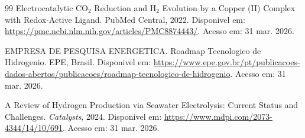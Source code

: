 \documentclass[12pt,oneside,a4paper,english,brazilian]{abntex2}
\begin{document}
\begin{thebibliography}{99}
Electrocatalytic CO$_2$ Reduction and H$_2$ Evolution by a Copper (II) Complex with Redox-Active Ligand. PubMed Central, 2022. Disponivel em: \url{https://pmc.ncbi.nlm.nih.gov/articles/PMC8874443/}. Acesso em: 31 mar. 2026.

EMPRESA DE PESQUISA ENERGETICA. Roadmap Tecnologico de Hidrogenio. EPE, Brasil. Disponivel em: \url{https://www.epe.gov.br/pt/publicacoes-dados-abertos/publicacoes/roadmap-tecnologico-de-hidrogenio}. Acesso em: 31 mar. 2026.

A Review of Hydrogen Production via Seawater Electrolysis: Current Status and Challenges. \textit{Catalysts}, 2024. Disponivel em: \url{https://www.mdpi.com/2073-4344/14/10/691}. Acesso em: 31 mar. 2026.

\end{thebibliography}
\end{document}

